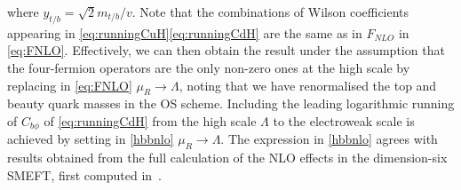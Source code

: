where $y_{t/b}=\sqrt{2} m_{t/b}/v$.
Note that the combinations of Wilson coefficients  appearing in \eqref{eq:runningCuH}\eqref{eq:runningCdH} are the same as in $F_{NLO}$ in \eqref{eq:FNLO}.
Effectively, we can then obtain the result under the assumption that the four-fermion operators are the only non-zero ones at the high scale by replacing in \eqref{eq:FNLO} $\mu_R \to \Lambda$, noting that we have renormalised the top and beauty quark masses in the OS scheme.
Including the leading logarithmic running of $C_{b\phi}$ of \eqref{eq:runningCdH} from the high scale $\Lambda$ to the electroweak scale is achieved by setting in \eqref{hbbnlo} $\mu_R\to \Lambda$.
The expression in \eqref{hbbnlo} agrees with results obtained from the full calculation of the NLO effects in the dimension-six SMEFT, first computed in~\cite{Gauld:2015lmb}. 
